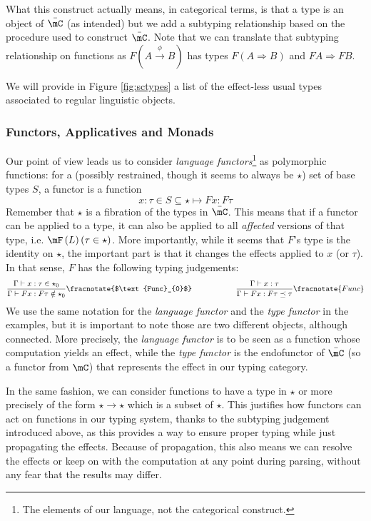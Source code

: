 What this construct actually means, in categorical terms, is that a type is an object of $\bar{\mC}$ (as intended) but we add a subtyping relationship based on the procedure used to construct $\bar{\mC}$.
Note that we can translate that subtyping relationship on functions as $F\left( A \xrightarrow{\phi} B \right)$ has types $F\left( A\Rightarrow B \right)$ and $FA \Rightarrow FB$.

We will provide in Figure \ref{fig:sctypes} a list of the effect-less usual types associated to regular linguistic objects.

\subsubsection{Functors, Applicatives and Monads}\label{subsubsec:functors}
Our point of view leads us to consider \emph{language functors}\footnote{The elements of our language, not the categorical construct.} as polymorphic functions: for a (possibly restrained, though it seems to always be $\star$) set of base types $S$, a functor is a function
\begin{equation*}
	x: \tau\in S\subseteq \star \mapsto F x: F\tau
\end{equation*}
Remember that $\star$ is a fibration of the types in $\bar{\mC}$.
This means that if a functor can be applied to a type, it can also be applied to all \emph{affected} versions of that type, i.e. $\mF\left( L \right)(\tau\in \star)$.
More importantly, while it seems that $F$'s type is the identity on $\star$, the important part is that it changes the effects applied to $x$ (or $\tau$).
In that sense, $F$ has the following typing judgements:
\begin{equation*}
	\frac{\Gamma\vdash x: \tau \in \star_{0}}{\Gamma\vdash F x: F\tau \notin \star_{0}}\fracnotate{$\text{Func}_{0}$} \hspace{2cm} \frac{\Gamma\vdash x: \tau}{\Gamma\vdash Fx : F\tau\preceq \tau}\fracnotate{Func}
\end{equation*}
We use the same notation for the \emph{language functor} and the \emph{type functor} in the examples, but it is important to note those are two different objects, although connected.
More precisely, the \emph{language functor} is to be seen as a function whose computation yields an effect, while the \emph{type functor} is the endofunctor of $\bar{\mC}$ (so a functor from $\mC$) that represents the effect in our typing category.

In the same fashion, we can consider functions to have a type in $\star$ or more precisely of the form $\star \to \star$ which is a subset of $\star$.
This justifies how functors can act on functions in our typing system, thanks to the subtyping judgement introduced above, as this provides a way to ensure proper typing while just propagating the effects.
Because of propagation, this also means we can resolve the effects or keep on with the computation at any point during parsing, without any fear that the results may differ.

